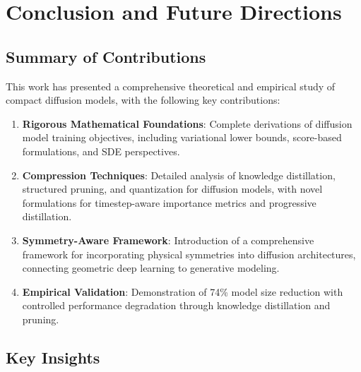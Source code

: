 \documentclass[12pt]{report}
\theoremstyle{definition}
\begin{document}
\chapter{Conclusion and Future Directions}

\section{Summary of Contributions}

This work has presented a comprehensive theoretical and empirical study of compact diffusion models, with the following key contributions:

\begin{enumerate}
\item \textbf{Rigorous Mathematical Foundations}: Complete derivations of diffusion model training objectives, including variational lower bounds, score-based formulations, and SDE perspectives.

\item \textbf{Compression Techniques}: Detailed analysis of knowledge distillation, structured pruning, and quantization for diffusion models, with novel formulations for timestep-aware importance metrics and progressive distillation.

\item \textbf{Symmetry-Aware Framework}: Introduction of a comprehensive framework for incorporating physical symmetries into diffusion architectures, connecting geometric deep learning to generative modeling.

\item \textbf{Empirical Validation}: Demonstration of 74\% model size reduction with controlled performance degradation through knowledge distillation and pruning.
\end{enumerate}

\section{Key Insights}
\end{document}
